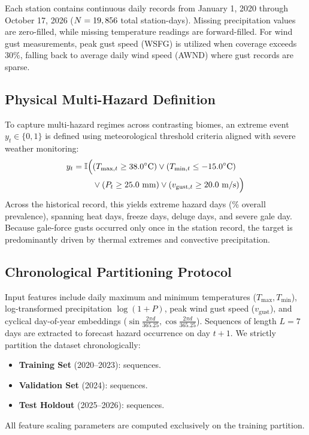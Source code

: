 \documentclass[conference]{IEEEtran}
\begin{document}
Each station contains continuous daily records from January 1, 2020 through October 17, 2026 ($N = 19,856{}$ total station-days). Missing precipitation values are zero-filled, while missing temperature readings are forward-filled. For wind gust measurements, peak gust speed (WSFG) is utilized when coverage exceeds 30\%, falling back to average daily wind speed (AWND) where gust records are sparse.

\subsection{Physical Multi-Hazard Definition}
To capture multi-hazard regimes across contrasting biomes, an extreme event $y_t \in \{0, 1\}$ is defined using meteorological threshold criteria aligned with severe weather monitoring:
\begin{align}
y_t = \mathbb{I}\Big( & (T_{\max, t} \ge 38.0^\circ\text{C}) \lor (T_{\min, t} \le -15.0^\circ\text{C}) \notag \\
& \lor (P_t \ge 25.0\text{ mm}) \lor (v_{\text{gust}, t} \ge 20.0\text{ m/s}) \Big)
\end{align}
Across the historical record, this yields \numExtremeEvents{} extreme hazard days (\prevalenceRate{}\% overall prevalence), spanning \numHeatDays{} heat days, \numFreezeDays{} freeze days, \numPrecipDays{} deluge days, and \numWindDays{} severe gale day. Because gale-force gusts occurred only once in the station record, the target is predominantly driven by thermal extremes and convective precipitation.

\subsection{Chronological Partitioning Protocol}
Input features include daily maximum and minimum temperatures ($T_{\max}, T_{\min}$), log-transformed precipitation $\log(1 + P)$, peak wind gust speed ($v_{\text{gust}}$), and cyclical day-of-year embeddings ($\sin \frac{2\pi d}{365.25}, \cos \frac{2\pi d}{365.25}$). Sequences of length $L = 7$ days are extracted to forecast hazard occurrence on day $t+1$. We strictly partition the dataset chronologically:
\begin{itemize}
    \item \textbf{Training Set} (2020--2023): \numTrainSeq{} sequences.
    \item \textbf{Validation Set} (2024): \numValSeq{} sequences.
    \item \textbf{Test Holdout} (2025--2026): \numTestSeq{} sequences.
\end{itemize}
All feature scaling parameters are computed exclusively on the training partition.
\end{document}
